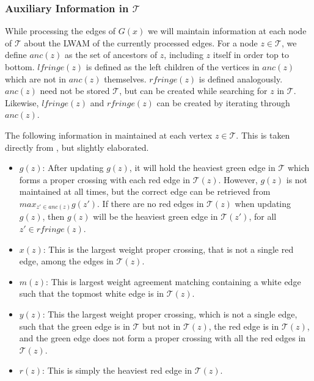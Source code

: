 \subsubsection{Auxiliary Information in $\mathcal{T}$}
While processing the edges of $G(x)$ we will maintain information at each node of $\mathcal{T}$ about the LWAM of the currently processed edges. For a node $z \in \mathcal{T}$, we define $anc(z)$ as the set of ancestors of $z$, including $z$ itself in order top to bottom. $lfringe(z)$ is defined as the left children of the vertices in $anc(z)$ which are not in $anc(z)$ themselves. $rfringe(z)$ is defined analogously. $anc(z)$ need not be stored $\mathcal{T}$, but can be created while searching for $z$ in $\mathcal{T}$. Likewise, $lfringe(z)$ and $rfringe(z)$ can be created by iterating through $anc(z)$.

The following information in maintained at each vertex $z \in \mathcal{T}$. This is taken directly from , but slightly elaborated.
\begin{itemize}
	\item $g(z)$: After updating $g(z)$, it will hold the heaviest green edge in $\mathcal{T}$ which	forms a proper crossing with each red edge in $\mathcal{T}(z)$.
	\subitem However, $g(z)$ is not maintained at all times, but the correct edge can be retrieved from $max_{z' \in anc(z)}g(z')$.
	\subitem If there are no red edges in $\mathcal{T}(z)$ when updating $g(z)$, then $g(z)$ will be the heaviest green edge in $\mathcal{T}(z')$, for all $z' \in rfringe(z)$.
	\item $x(z)$: This is the largest weight proper crossing, that is not a single red edge, among the edges in $\mathcal{T}(z)$.
	\item $m(z)$: This is largest weight agreement matching containing a white edge
	such that the topmost white edge is in $\mathcal{T}(z)$.
	\item $y(z)$: This the largest weight proper crossing, which is not a single edge, such that the green edge is in $\mathcal{T}$ but not in $\mathcal{T}(z)$, the red edge is in $\mathcal{T}(z)$, and the green edge does not form a proper crossing with all the red edges in $\mathcal{T}(z)$.
	\item $r(z)$: This is simply the heaviest red edge in $\mathcal{T}(z)$.
\end{itemize}





